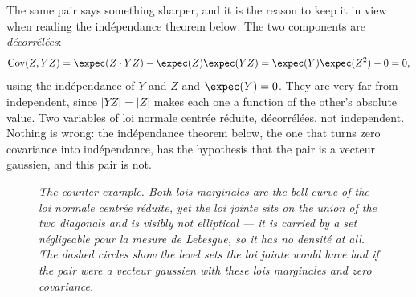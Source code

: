 \begin{remark}
The same pair says something sharper, and it is the reason to keep it in view
when reading the indépendance theorem below. The two components are
\emph{décorrélées}:
\[
  \Cov(Z, YZ) = \expec(Z \cdot YZ) - \expec(Z)\expec(YZ)
              = \expec(Y)\expec(Z^{2}) - 0 = 0 ,
\]
using the indépendance of $Y$ and $Z$ and $\expec(Y) = 0$. They are very far from
independent, since $|YZ| = |Z|$ makes each one a function of the other's absolute
value. Two variables of loi normale centrée réduite, décorrélées, not
independent. Nothing is wrong: the indépendance theorem below, the one that turns
zero covariance into indépendance, has the hypothesis that the pair is a vecteur
gaussien, and this pair is not.
\end{remark}

\begin{figure}[ht]
\centering
{}

{\centering \small \textit{The counter-example. Both lois marginales are the bell
curve of the loi normale centrée réduite, yet the loi jointe sits on the union of
the two diagonals and is visibly not elliptical --- it is carried by a set
négligeable pour la mesure de Lebesgue, so it has no densité at all. The dashed
circles show the level sets the loi jointe would have had if the pair were a
vecteur gaussien with these lois marginales and zero covariance.}\par}
\end{figure}

